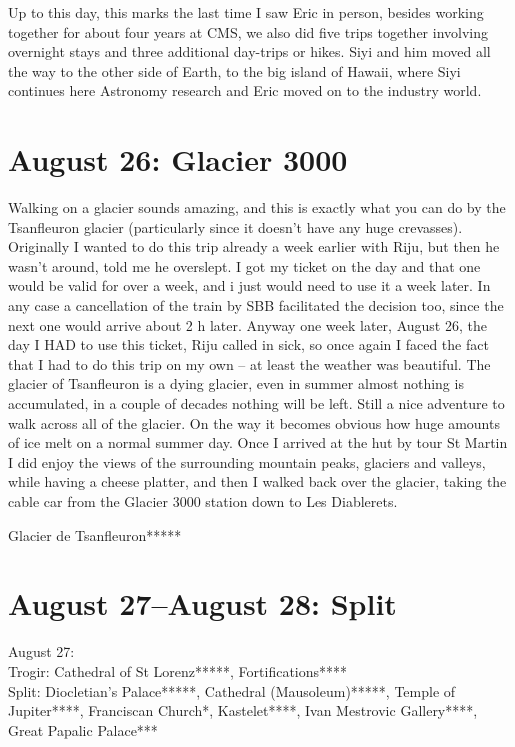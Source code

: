 Up to this day, this marks the last time I saw Eric in person, besides working together for about four years at CMS, we also did five trips together involving overnight stays and three additional day-trips or hikes. Siyi and him moved all the way to the other side of Earth, to the big island of Hawaii, where Siyi continues here Astronomy research and Eric moved on to the industry world.\\

\section{August 26: Glacier 3000}
\label{lesdiablerets2017}

Walking on a glacier sounds amazing, and this is exactly what you can do by the Tsanfleuron glacier (particularly since it doesn't have any huge crevasses). Originally I wanted to do this trip already a week earlier with Riju, but then he wasn't around, told me he overslept. I got my ticket on the day and that one would be valid for over a week, and i just would need to use it a week later. In any case a cancellation of the train by SBB facilitated the decision too, since the next one would arrive about 2 h later. Anyway one week later, August 26, the day I HAD to use this ticket, Riju called in sick, so once again I faced the fact that I had to do this trip on my own -- at least the weather was beautiful. The glacier of Tsanfleuron is a dying glacier, even in summer almost nothing is accumulated, in a couple of decades nothing will be left. Still a nice adventure to walk across all of the glacier. On the way it becomes obvious how huge amounts of ice melt on a normal summer day. Once I arrived at the hut by tour St Martin I did enjoy the views of the surrounding mountain peaks, glaciers and valleys, while having a cheese platter, and then I walked back over the glacier, taking the cable car from the Glacier 3000 station down to Les Diablerets.

Glacier de Tsanfleuron*****

\section{August 27--August 28: Split}
\label{split2017}

August 27:\\
Trogir: Cathedral of St Lorenz*****, Fortifications****\\
Split: Diocletian's Palace*****, Cathedral (Mausoleum)*****, Temple of Jupiter****, Franciscan Church*, Kastelet****, Ivan Mestrovic Gallery****, Great Papalic Palace***

